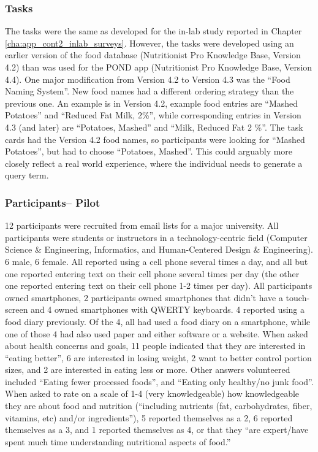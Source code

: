 \subsubsection{Tasks}
The tasks were the same as developed for the in-lab study reported in Chapter \ref{cha:app_cont2_inlab_surveys}. However, the tasks were developed using an earlier version of the food database (Nutritionist Pro Knowledge Base, Version 4.2) than was used for the POND app (Nutritionist Pro Knowledge Base, Version 4.4). One major modification from Version 4.2 to Version 4.3 was the ``Food Naming System''. New food names had a different ordering strategy than the previous one. An example is in Version 4.2, example food entries are ``Mashed Potatoes'' and ``Reduced Fat Milk, 2\%'', while corresponding entries in Version 4.3 (and later) are ``Potatoes, Mashed'' and ``Milk, Reduced Fat 2 \%''. The task cards had the Version 4.2 food names, so participants were looking for ``Mashed Potatoes'', but had to choose ``Potatoes, Mashed''. This could arguably more closely reflect a real world experience, where the individual needs to generate a query term.

\subsubsection{Participants-- Pilot}

12 participants were recruited from email lists for a major university. All participants were students or instructors in a technology-centric field (Computer Science \& Engineering, Informatics,  and Human-Centered Design \& Engineering). 6 male, 6 female.  All reported using a cell phone several times a day, and all but one reported entering text on their cell phone several times per day (the other one reported entering text on their cell phone 1-2 times per day). All participants owned smartphones, 2 participants owned smartphones that didn't have a touch-screen and 4 owned smartphones with QWERTY keyboards. 4 reported using a food diary previously. Of the 4, all had used a food diary on a smartphone, while one of those 4 had also used paper and either software or a website. When asked about health concerns and goals, 11 people indicated that they are interested in ``eating better'', 6 are interested in losing weight, 2 want to better control portion sizes, and 2 are interested in eating less or more. Other answers volunteered included ``Eating fewer processed foods'', and ``Eating only healthy/no junk food''. When asked to rate on a scale of 1-4 (very knowledgeable) how knowledgeable they are about food and nutrition (``including nutrients (fat, carbohydrates, fiber, vitamins, etc) and/or ingredients''), 5 reported themselves as a 2, 6 reported themselves as a 3, and 1 reported themselves as 4, or that they ``are expert/have spent much time understanding nutritional aspects of food.''

